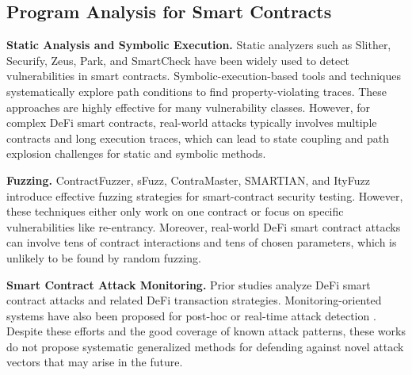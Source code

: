 \subsection{Program Analysis for Smart Contracts}


\noindent \textbf{Static Analysis and Symbolic Execution.}
Static analyzers such as Slither, Securify, Zeus, Park, and 
SmartCheck\cite{feist2019slither,tsankov2018securify,
kalra2018zeus,zheng2022park,tikhomirov2018smartcheck}
have been widely used to detect vulnerabilities in smart contracts.
Symbolic-execution-based tools and 
techniques\cite{king1976symbolic,mythril,luu2016making,liu2020towards,
frank2020ethbmc,feng2019precise,mossberg2019manticore}
systematically explore path conditions to find property-violating traces.
These approaches are highly effective for many vulnerability classes. 
However, for complex DeFi smart contracts, real-world attacks typically 
involves multiple contracts and long execution traces, 
which can lead to state coupling and path explosion 
challenges for static and symbolic methods.

\noindent \textbf{Fuzzing.}
ContractFuzzer, sFuzz, ContraMaster, SMARTIAN, 
and ItyFuzz\cite{jiang2018contractfuzzer,nguyen2020sfuzz,wang2020oracle,
choi2021smartian,shou2023ityfuzz}
introduce effective fuzzing strategies for smart-contract security testing.
However, these techniques either only work on one contract or focus
on specific vulnerabilities like re-entrancy. 
Moreover, real-world DeFi smart contract attacks can 
involve tens of contract interactions and tens of chosen parameters,
which is unlikely to be found by random fuzzing. 


\noindent \textbf{Smart Contract Attack Monitoring.}
Prior studies analyze DeFi smart contract attacks and related
 DeFi transaction strategies\cite{qin2021attacking,cao2021flashot,
 werapun2022flash,wang2021towards,gan2022understanding}.
Monitoring-oriented systems have also been proposed 
for post-hoc or real-time attack detection
\cite{xia2023detecting,ramezany2023midnight,wang2022defiscanner}.
Despite these efforts and the good coverage of known attack patterns, 
these works do not propose systematic generalized methods for defending 
against novel attack vectors that may arise in the future. 

